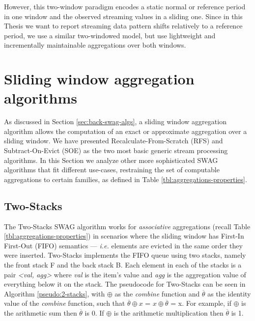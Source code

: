 However, this two-window paradigm encodes a static normal or reference period in one window and the observed streaming values in a sliding one. Since in this Thesis we want to report streaming data pattern shifts relatively to a reference period, we use a similar two-windowed model, but use lightweight and incrementally maintainable aggregations over both windows.




\section{Sliding window aggregation algorithms} \label{sec:sota-swag-algs}

As discussed in Section \ref{sec:back-swag-algs}, a sliding window aggregation algorithm allows the computation of an exact or approximate aggregation over a sliding window. We have presented Recalculate-From-Scratch (RFS) and Subtract-On-Evict (SOE) as the two most basic generic stream processing algorithms. In this Section we analyze other more sophisticated SWAG algorithms that fit different use-cases, restraining the set of computable aggregations to certain families, as defined in Table \ref{tbl:aggregations-properties}.

\subsection{Two-Stacks} \label{sec:2stacks}
The Two-Stacks SWAG algorithm works for \textit{associative} aggregations (recall Table \ref{tbl:aggregations-properties}) in scenarios where the sliding window has First-In First-Out (FIFO) semantics --- \textit{i.e.} elements are evicted in the same order they were inserted. Two-Stacks \cite{Tangwongsan-DABA} implements the FIFO queue using two stacks, namely the front stack F and the back stack B. Each element in each of the stacks is a pair \textit{<val, agg>} where \textit{val} is the item's value and \textit{agg} is the aggregation value of everything below it on the stack. The pseudocode for Two-Stacks can be seen in Algorithm \ref{pseudo:2-stacks}, with $\oplus$ as the \textit{combine} function and $\overline{\theta}$ as the identity value of the \textit{combine} function, such that $\overline{\theta} \oplus x$ = $x \oplus \overline{\theta}$ = x. For example, if $\oplus$ is the arithmetic sum then $\overline{\theta}$ is 0. If $\oplus$ is the arithmetic multiplication then $\overline{\theta}$ is 1.

